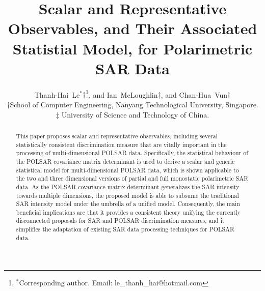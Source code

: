 \documentclass[printer]{tRSL2e}
\title{
  Scalar and Representative Observables, and Their Associated Statistial Model, for Polarimetric SAR Data
}
\begin{document}
\author{
  Thanh-Hai~Le$^{\ast}$$\dag$\thanks{$^\ast$Corresponding
author. Email: le\_thanh\_hai@hotmail.com \vspace{6pt}},
  and Ian~McLoughlin${\ddag}$, 
  and Chan-Hua~Vun${\dag}$\\
\vspace{6pt} $\dag$School of Computer Engineering, Nanyang Technological University, Singapore.\\
$\ddag$ University of Science and Technology of China.\\
\vspace{6pt} }

\maketitle

\begin{abstract}
This paper proposes scalar and representative observables,
  including several statistically consistent discrimination measure
  that are vitally important in the processing of multi-dimensional POLSAR data.
Specifically, the statistical behaviour of the POLSAR covariance matrix determinant is used
  to derive a scalar and generic statistical model for multi-dimensional POLSAR data,
  which is shown applicable to the two and three dimensional versions of partial and full monostatic polarimetric SAR data.
As the POLSAR covariance matrix determinant generalizes the SAR intensity towards multiple dimensions,
  the proposed model is able to subsume the traditional SAR intensity model under the umbrella of a unified model. 
Consequently, the main beneficial implications are that %
  it provides a consistent theory unifying the currently disconnected proposals for SAR and POLSAR discrimination measures,
  and it simplifies the adaptation of existing SAR data processing techniques for POLSAR data.
\end{abstract}
\end{document}
